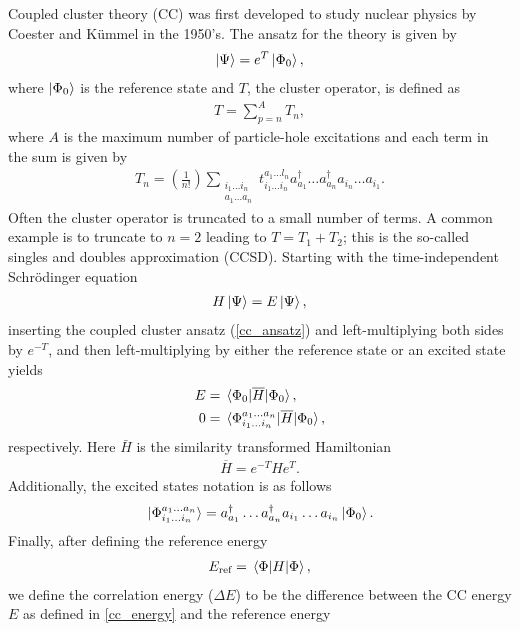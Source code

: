 \documentclass[Dual]{msu-thesis}
\begin{document}
Coupled cluster theory (CC) was first developed to study nuclear physics by Coester and K\"{u}mmel \cite{coupled_cluster_theory} in the 1950's. The ansatz for the theory is given by
\begin{align}
\label{cc_ansatz}
\ket{\Psi}=e^T\ket{\Phi_0},
\end{align}
where $\ket{\Phi_0}$ is the reference state and $T$, the cluster operator, is defined as
\begin{align}
\label{cluster_op_def}
T = \sum_{p=n}^AT_n,
\end{align}
where $A$ is the maximum number of particle-hole excitations and each term in the sum is given by
\begin{align}
T_n=\left(\frac{1}{n!}\right)\sum_{\substack{i_1\ldots i_n \\ a_1\ldots a_n}}t_{i_1\ldots i_n}^{a_1\ldots l_n}a^\dagger_{a_1}\ldots a^\dagger_{a_n}a_{i_n}\ldots a_{i_1}.
\end{align}
Often the cluster operator is truncated to a small number of terms. A common example is to truncate to $n=2$ leading to $T=T_1+T_2$; this is the so-called singles and doubles approximation (CCSD).
Starting with the time-independent Schr\"{o}dinger equation \begin{align}
H\ket{\Psi}=E\ket{\Psi},
\end{align}
inserting the coupled cluster ansatz (\ref{cc_ansatz}) and left-multiplying both sides by $e^{-T}$, and then left-multiplying by either the reference state or an excited state yields
\begin{align}
\label{cc_energy} 
E&=\mel{\Phi_0}{\overline{H}}{\Phi_0},
\\
\label{cc_eq}
0&=\mel*{\Phi^{a_1\ldots a_n}_{i_1\ldots i_n}}{\overline{H}}{\Phi_0},
\end{align}
respectively. Here $\bar{H}$ is the similarity transformed Hamiltonian
\begin{align}
\label{sim_H}
\overline{H}
=
e^{-T}He^T.
\end{align}
Additionally, the excited states notation is as follows
\begin{align}
\ket*{\Phi^{a_1\ldots a_n}_{i_1\ldots i_n}}
=
a^\dagger_{a_1}\ldots a^\dagger_{a_n}
a_{i_1}\ldots a_{i_n}
\ket{\Phi_0}.
\end{align}
Finally, after defining the reference energy
\begin{align}
E_{\text{ref}}=\mel{\Phi}{H}{\Phi},
\end{align}
we define the correlation energy ($\Delta E$) to be the difference between the CC energy $E$ as defined in \ref{cc_energy} and the reference energy
\end{document}
